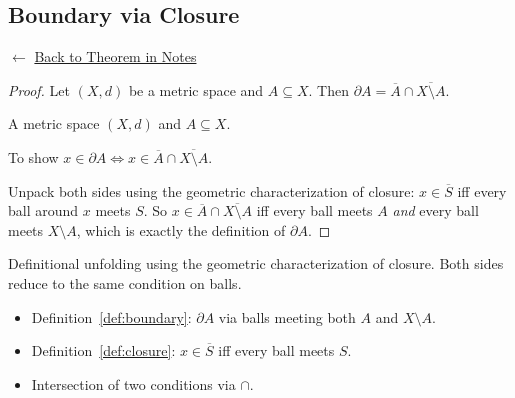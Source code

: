 
\subsection*{Boundary via Closure}
\label{prf:boundary-closure}

\begin{remark*}[Return]
$\leftarrow$ \hyperref[thm:boundary-closure]{Back to Theorem in Notes}
\end{remark*}

\begin{proof}
\Claim Let $(X,d)$ be a metric space and $A \subseteq X$.
Then $\partial A = \overline{A} \cap \overline{X \setminus A}$.

\Given A metric space $(X,d)$ and $A \subseteq X$.

\Goal To show $x \in \partial A \iff x \in \overline{A} \cap \overline{X \setminus A}$.

\Strategy Unpack both sides using the geometric characterization of closure:
$x \in \overline{S}$ iff every ball around $x$ meets $S$.
So $x \in \overline{A} \cap \overline{X \setminus A}$ iff every ball meets $A$
\emph{and} every ball meets $X \setminus A$, which is exactly the definition of $\partial A$.


\end{proof}

\begin{remark*}
Definitional unfolding using the geometric characterization of closure.
Both sides reduce to the same condition on balls.
\end{remark*}

\begin{remark*}[Dependencies]
\begin{itemize}
  \item Definition~\ref{def:boundary}: $\partial A$ via balls meeting both $A$ and $X \setminus A$.
  \item Definition~\ref{def:closure}: $x \in \overline{S}$ iff every ball meets $S$.
  \item Intersection of two conditions via $\cap$.
\end{itemize}
\end{remark*}
